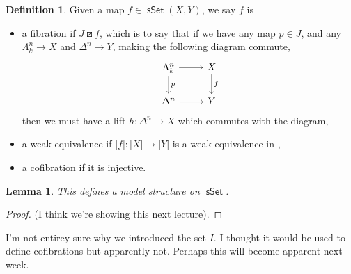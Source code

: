 \documentclass{amsart}
\newcommand{\catname}[1]{{\sffamily\upshape{{#1}}}}
\newcommand{\topp}{\catname{Top}}
\DeclareMathOperator{\msset}{\mathsf{sSet}}
\newtheorem{lemma}[theorem]{Lemma}
\theoremstyle{definition}
\newtheorem{definition}[theorem]{Definition}
\begin{document}
\begin{definition}
  Given a map $f\in \msset (X,Y)$, we say $f$ is
  \begin{itemize}
  \item a fibration if $J \boxslash f$, which is to say that if
    we have any map $p\in J$, and any $\Lambda^n_k \to X$
    and $\Delta^n \to Y$, making the following diagram commute,
    \[
    \begin{tikzcd}
      \Lambda^n_k \arrow[r] \arrow[d, "p"] & X \arrow[d, "f"] \\
      \Delta^n \arrow[r] &Y
    \end{tikzcd}
  \]
  then we must have a lift $h: \Delta^n \to X$ which commutes with the diagram,
\item a weak equivalence if $|f|: |X|\to |Y|$ is a weak equivalence in
  \topp,
\item a cofibration if it is injective.
\end{itemize}
\end{definition}
\begin{lemma}
  This defines a model structure on $\msset$.
\end{lemma}
\begin{proof}
  (I think we're showing this next lecture).
\end{proof}
I'm not entirey sure why we introduced the set $I$. I thought it would be used
to define cofibrations but apparently not. Perhaps this will become
apparent next week.
\end{document}
